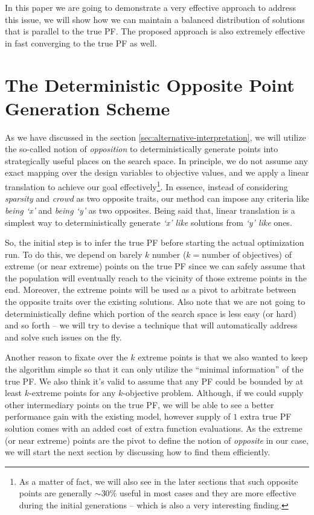 \documentclass{sig-alternate-05-2015}
\begin{document}
In this paper we are going to demonstrate a very effective approach to address this issue, we will show how we can maintain a balanced distribution of solutions that is parallel to the true PF. The proposed approach is also extremely effective in fast converging to the true PF as well.   

\section{The Deterministic Opposite Point Generation Scheme}
\label{sec:generation-scheme}
As we have discussed in the section \ref{sec:alternative-interpretation}, we will utilize the so-called notion of \textit{opposition} to deterministically generate points into strategically useful places on the search space. In principle, we do not assume any exact mapping over the design variables to objective values, and we apply a linear translation to achieve our goal effectively\footnote{As a matter of fact, we will also see in the later sections that such opposite points are generally \(\sim 30\%\) useful in most cases and they are more effective during the initial generations -- which is also a very interesting finding.}. In essence, instead of considering \textit{sparsity} and \textit{crowd} as two opposite traits, our method can impose any criteria like \textit{being `x'} and \textit{being `y'} as two opposites. Being said that, linear translation is a simplest way to deterministically generate \textit{`x' like} solutions from \textit{`y' like} ones. 

So, the initial step is to infer the true PF before starting the actual optimization run. To do this, we depend on barely \(k\) number (\(k = \text{number of objectives}\)) of extreme (or near extreme) points on the true PF since we can safely assume that the population will eventually reach to the vicinity of those extreme points in the end. Moreover, the extreme points will be used as a pivot to arbitrate between the opposite traits over the existing solutions. Also note that we are not going to deterministically define which portion of the search space is less easy (or hard) and so forth -- we will try to devise a technique that will automatically address and solve such issues on the fly.

Another reason to fixate over the \(k\) extreme points is that we also wanted to keep the algorithm simple so that it can only utilize the ``minimal information'' of the true PF. We also think it's valid to assume that any PF could be bounded by at least \(k\)-extreme points for any \(k\)-objective problem. Although, if we could supply other intermediary points on the true PF, we will be able to see a better performance gain with the existing model, however supply of \(1\) extra true PF solution comes with an added cost of extra function evaluations. As the extreme (or near extreme) points are the pivot to define the notion of \textit{opposite} in our case, we will start the next section by discussing how to find them efficiently.
\end{document}
